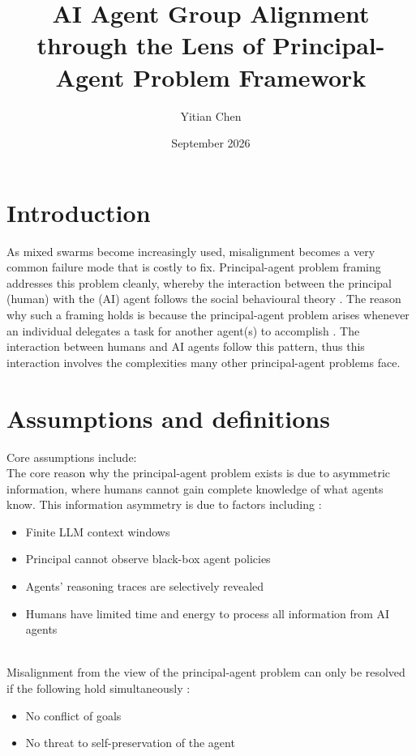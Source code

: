 \documentclass{article}
\title{AI Agent Group Alignment through the Lens of Principal-Agent Problem Framework}
\author{Yitian Chen}
\date{September 2026}
\begin{document}
\maketitle

\section{Introduction}

As mixed swarms become increasingly used, misalignment becomes a very common failure mode that is costly to fix. Principal-agent problem framing addresses this problem cleanly, whereby the interaction between the principal (human) with the (AI) agent follows the social behavioural theory \citep{rauba2026}. The reason why such a framing holds is because the principal-agent problem arises whenever an individual delegates a task for another agent(s) to accomplish \citep{jensen1976,lupia2001}. The interaction between humans and AI agents follow this pattern, thus this interaction involves the complexities many other principal-agent problems face. 

\section{Assumptions and definitions}

Core assumptions include: \\


The core reason why the principal-agent problem exists is due to asymmetric information, where humans cannot gain complete knowledge of what agents know. This information asymmetry is due to factors including \citep{rauba2026}: 

\begin{itemize}
    \item Finite LLM context windows \citep{liu2024lost}
    \item Principal cannot observe black-box agent policies
    \item Agents' reasoning traces are selectively revealed \citep{turpin2023}
    \item Humans have limited time and energy to process all information from AI agents \citep{kwa2025}
\end{itemize} \\

Misalignment from the view of the principal-agent problem can only be resolved if the following hold simultaneously \citep{lynch2025}:

\begin{itemize}
    \item No conflict of goals
    \item No threat to self-preservation of the agent
\end{itemize}
\end{document}
